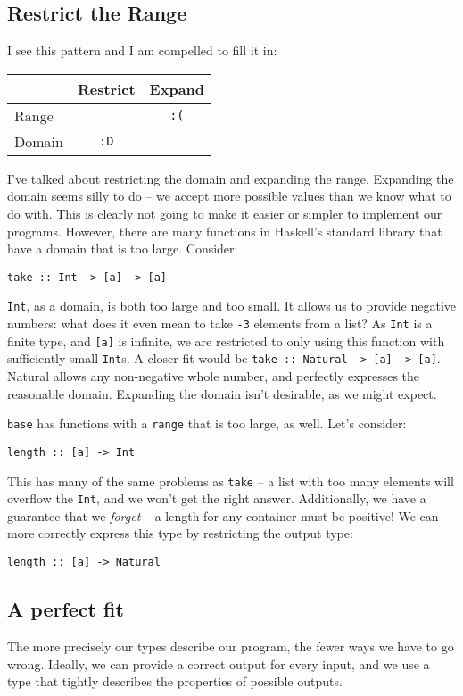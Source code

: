 \subsection{Restrict the Range}

I see this pattern and I am compelled to fill it in:
\begin{table}[htbp]
\centering
\begin{tabular}{lcc}
 & \textbf{Restrict}  & \textbf{Expand} \\
\hline
Range &  & \texttt{:(} \\
Domain & \texttt{:D} & \\
\end{tabular} 
\end{table}
I've talked about restricting the domain and expanding the range. Expanding the domain seems silly to do -- we accept more possible values than we know what to do with. This is clearly not going to make it easier or simpler to implement our programs. However, there are many functions in Haskell's standard library that have a domain that is too large. Consider:

\begin{verbatim}
take :: Int -> [a] -> [a]
\end{verbatim}
\texttt{Int}, as a domain, is both too large and too small. It allows us to provide negative numbers: what does it even mean to take \texttt{-3} elements from a list? As \texttt{Int} is a finite type, and \texttt{[a]} is infinite, we are restricted to only using this function with sufficiently small \texttt{Int}s. A closer fit would be \texttt{take :: Natural -> [a] -> [a]}. Natural allows any non-negative whole number, and perfectly expresses the reasonable domain. Expanding the domain isn't desirable, as we might expect.

\texttt{base} has functions with a \texttt{range} that is too large, as well. Let's consider:
\begin{verbatim}
length :: [a] -> Int
\end{verbatim}
This has many of the same problems as \texttt{take} -- a list with too many elements will overflow the \texttt{Int}, and we won't get the right answer. Additionally, we have a guarantee that we \textit{forget} -- a length for any container must be positive! We can more correctly express this type by restricting the output type:

\begin{verbatim}
length :: [a] -> Natural
\end{verbatim}

\subsection{A perfect fit}


The more precisely our types describe our program, the fewer ways we have to go wrong. Ideally, we can provide a correct output for every input, and we use a type that tightly describes the properties of possible outputs.
